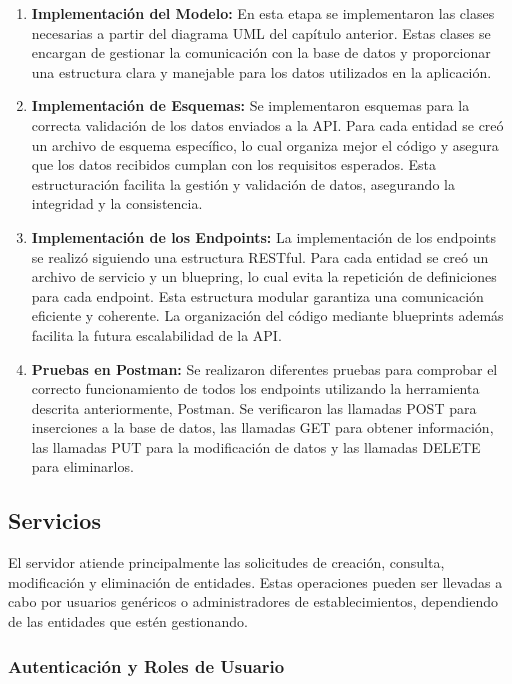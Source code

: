 \begin{enumerate}

    \item \textbf{Implementación del Modelo: } En esta etapa se implementaron las clases necesarias a partir del diagrama UML del capítulo anterior. Estas clases se encargan de gestionar la comunicación con la base de datos y proporcionar una estructura clara y manejable para los datos utilizados en la aplicación.

    \item \textbf{Implementación de Esquemas: } Se implementaron esquemas para la correcta validación de los datos enviados a la API. Para cada entidad se creó un archivo de esquema específico, lo cual organiza mejor el código y asegura que los datos recibidos cumplan con los requisitos esperados. Esta estructuración facilita la gestión y validación de datos, asegurando la integridad y la consistencia.

    \item \textbf{Implementación de los Endpoints: } La implementación de los endpoints se realizó siguiendo una estructura RESTful. Para cada entidad se creó un archivo de servicio y un bluepring, lo cual evita la repetición de definiciones para cada endpoint. Esta estructura modular garantiza una comunicación eficiente y coherente. La organización del código mediante blueprints además facilita la futura escalabilidad de la API.

    \item \textbf{Pruebas en Postman: } Se realizaron diferentes pruebas para comprobar el correcto funcionamiento de todos los endpoints utilizando la herramienta descrita anteriormente, Postman. Se verificaron las llamadas POST para inserciones a la base de datos, las llamadas GET para obtener información, las llamadas PUT para la modificación de datos y las llamadas DELETE para eliminarlos.
\end{enumerate}

\subsection{Servicios}

El servidor atiende principalmente las solicitudes de creación, consulta, modificación y eliminación de entidades. Estas operaciones pueden ser llevadas a cabo por usuarios genéricos o administradores de establecimientos, dependiendo de las entidades que estén gestionando.

\subsubsection{Autenticación y Roles de Usuario}

